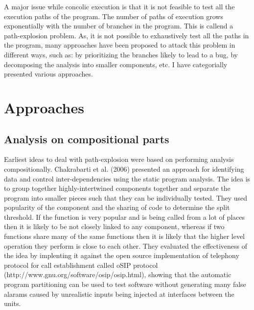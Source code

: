 \documentclass[	runningheads,
				a4paper]{llncs}
\begin{document}
A major issue while concolic execution is that it is not feasible to test all the execution paths of the program. The number of paths of execution grows exponentially with the number of branches in the program. This is callend a path-explosion problem. As, it is not possible to exhaustively test all the paths in the program, many approaches have been proposed to attack this problem in different ways, such as: by prioritizing the branches likely to lead to a bug, by decomposing the analysis into smaller components, etc. I have categorially presented various approaches.


\section{Approaches}


\subsection{Analysis on compositional parts}

Earliest ideas to deal with path-explosion were based on performing analysis compositionally.
Chakrabarti et al. (2006) \cite{chakrabarti2006software} presented an approach for identifying data and control inter-dependencies using the static program analysis. The idea is to group together highly-intertwined components together and separate the program into smaller pieces such that they can be individually tested. They used popularity of the component and the sharing of code to determine the split threshold. If the function is very popular and is being called from a lot of places then it is likely to be not closely linked to any component, whereas if two functions share many of the same functions then it is likely that the higher level operation they perform is close to each other. They evaluated the effectiveness of the idea by implenting it against the open source implementation of telephony protocol for call establishment called oSIP protocol (http://www.gnu.org/software/osip/osip.html), showing that the automatic program partitioning can be used to test software without generating many false alarams caused by unrealistic inputs being injected at interfaces between the units.
\end{document}

